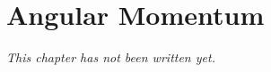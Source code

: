 \chapter{Angular Momentum}\label{ch:b1:angular-momentum}


\emph{This chapter has not been written yet.}
